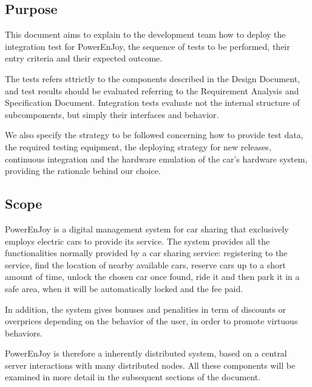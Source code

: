 \documentclass[11pt]{article} %
\newcommand{\pe}{PowerEnJoy }
\newcommand{\pecomma}{PowerEnJoy, }
\begin{document}
\subsection{Purpose}

This document aims to explain to the development team how to deploy the integration test for \pecomma the sequence of tests to be performed, their entry criteria and their expected outcome. 

The tests refers sttrictly to the components described in the Design Document, and test results should be evaluated referring to the Requirement Analysis and Specification Document. Integration tests evaluate not the internal structure of subcomponents, but simply their interfaces and behavior.

We also specify the strategy to be followed concerning how to provide test data, the required testing equipment, the deploying strategy for new releases, continuous integration and the hardware emulation of the car's hardware system, providing the rationale behind our choice.

\subsection{Scope}

\pe is a digital management system for car sharing that exclusively employs electric cars to provide its service. The system provides all the functionalities normally provided by a car sharing service: registering to the service, find the location of nearby available cars, reserve cars up to a short amount of time, unlock the chosen car once found, ride it and then park it in a safe area, when it will be automatically locked and the fee paid.

In addition, the system gives bonuses and penalities in term of discounts or overprices depending on the behavior of the user, in order to promote virtuous behaviors.

\pe is therefore a inherently distributed system, based on a central server interactions with many distributed nodes. All these components will be examined in more detail in the subsequent sections of the document.
\end{document}
